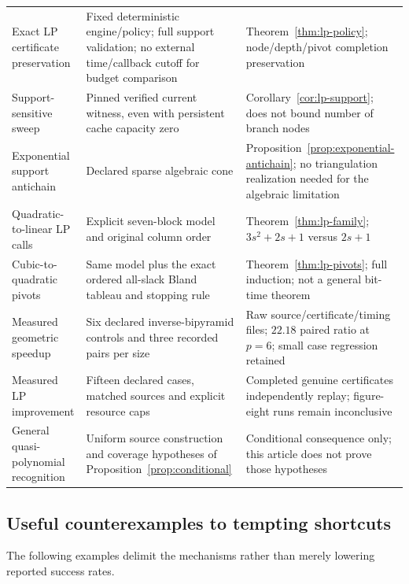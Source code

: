 \begin{longtable}{@{}>{\raggedright\arraybackslash}p{}>{\raggedright\arraybackslash}p{}>{\raggedright\arraybackslash}p{}@{}}
Exact LP certificate preservation & Fixed deterministic engine/policy; full support validation; no external time/callback cutoff for budget comparison & Theorem~\ref{thm:lp-policy}; node/depth/pivot completion preservation\\[0.45em]
Support-sensitive sweep & Pinned verified current witness, even with persistent cache capacity zero & Corollary~\ref{cor:lp-support}; does not bound number of branch nodes\\[0.45em]
Exponential support antichain & Declared sparse algebraic cone & Proposition~\ref{prop:exponential-antichain}; no triangulation realization needed for the algebraic limitation\\[0.45em]
Quadratic-to-linear LP calls & Explicit seven-block model and original column order & Theorem~\ref{thm:lp-family}; $3s^2+2s+1$ versus $2s+1$\\[0.45em]
Cubic-to-quadratic pivots & Same model plus the exact ordered all-slack Bland tableau and stopping rule & Theorem~\ref{thm:lp-pivots}; full induction; not a general bit-time theorem\\[0.45em]
Measured geometric speedup & Six declared inverse-bipyramid controls and three recorded pairs per size & Raw source/certificate/timing files; $22.18$ paired ratio at $p=6$; small case regression retained\\[0.45em]
Measured LP improvement & Fifteen declared cases, matched sources and explicit resource caps & Completed genuine certificates independently replay; figure-eight runs remain inconclusive\\[0.45em]
General quasi-polynomial recognition & Uniform source construction and coverage hypotheses of Proposition~\ref{prop:conditional} & Conditional consequence only; this article does not prove those hypotheses\\
\bottomrule
\end{longtable}
\endgroup

\subsection{Useful counterexamples to tempting shortcuts}

The following examples delimit the mechanisms rather than merely lowering
reported success rates.

